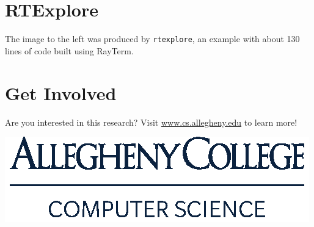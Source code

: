\documentclass[alleghenyposter]{betterposter}
\begin{document}
{\section{RTExplore}
The image to the left was produced by \texttt{rtexplore}, an example with about 130 lines of code built using RayTerm.

\section{Get Involved}
Are you interested in this research? Visit \url{www.cs.allegheny.edu} to learn more!

\vfill

\includegraphics[width=\textwidth]{img/cmpsc-logo}\\

}
\end{document}
